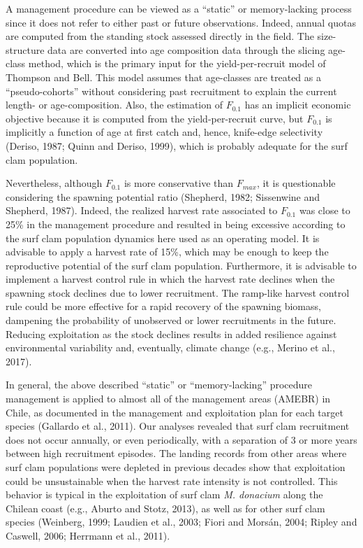 \documentclass[12pt]{article}
\begin{document}
A management procedure can be viewed as a ``static'' or memory-lacking
process since it does not refer to either past or future observations.
Indeed, annual quotas are computed from the standing stock assessed
directly in the field. The size-structure data are converted into age
composition data through the slicing age-class method, which is the
primary input for the yield-per-recruit model of Thompson and Bell. This
model assumes that age-classes are treated as a ``pseudo-cohorts''
without considering past recruitment to explain the current length- or
age-composition. Also, the estimation of \(F_{0.1}\) has an implicit
economic objective because it is computed from the yield-per-recruit
curve, but \(F_{0.1}\) is implicitly a function of age at first catch
and, hence, knife-edge selectivity (Deriso, 1987; Quinn and Deriso,
1999), which is probably adequate for the surf clam population.

Nevertheless, although \(F_{0.1}\) is more conservative than
\(F_{max}\), it is questionable considering the spawning potential ratio
(Shepherd, 1982; Sissenwine and Shepherd, 1987). Indeed, the realized
harvest rate associated to \(F_{0.1}\) was close to 25\% in the
management procedure and resulted in being excessive according to the
surf clam population dynamics here used as an operating model. It is
advisable to apply a harvest rate of 15\%, which may be enough to keep
the reproductive potential of the surf clam population. Furthermore, it
is advisable to implement a harvest control rule in which the harvest
rate declines when the spawning stock declines due to lower recruitment.
The ramp-like harvest control rule could be more effective for a rapid
recovery of the spawning biomass, dampening the probability of
unobserved or lower recruitments in the future. Reducing exploitation as
the stock declines results in added resilience against environmental
variability and, eventually, climate change (e.g., Merino et al., 2017).

In general, the above described ``static'' or ``memory-lacking''
procedure management is applied to almost all of the management areas
(AMEBR) in Chile, as documented in the management and exploitation plan
for each target species (Gallardo et al., 2011). Our analyses revealed
that surf clam recruitment does not occur annually, or even
periodically, with a separation of 3 or more years between high
recruitment episodes. The landing records from other areas where surf
clam populations were depleted in previous decades show that
exploitation could be unsustainable when the harvest rate intensity is
not controlled. This behavior is typical in the exploitation of surf
clam \emph{M. donacium} along the Chilean coast (e.g., Aburto and Stotz,
2013), as well as for other surf clam species (Weinberg, 1999; Laudien
et al., 2003; Fiori and Morsán, 2004; Ripley and Caswell, 2006; Herrmann
et al., 2011).
\end{document}
